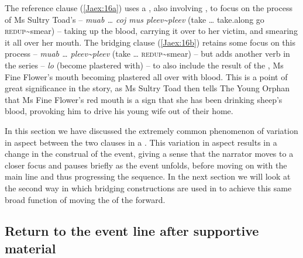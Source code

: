 \documentclass[output=paper]{LSP/langsci}
\begin{document}
\noindent
The reference clause (\ref{Jaex:16a}) uses a , also involving , to focus on the process of Ms Sultry Toad’s  – \textit{muab … coj mus pleev{\textasciitilde}pleev }(take … take.along go \textsc{redup}{\textasciitilde}smear) – taking up the blood, carrying it over to her victim, and smearing it all over her mouth. The bridging clause (\ref{Jaex:16b}) retains some focus on this process – \textit{muab … pleev{\textasciitilde}pleev }(take … \textsc{redup}{\textasciitilde}smear) – but adds another verb in the series – \textit{lo }(become plastered with) – to also include the result of the , Ms Fine Flower’s mouth becoming plastered all over with blood. This is a point of great significance in the story, as Ms Sultry Toad then tells The Young Orphan that Ms Fine Flower’s red mouth is a sign that she has been drinking sheep’s blood, provoking him to drive his young wife out of their home.
 
In this section we have discussed the extremely common phenomenon of variation in aspect between the two clauses in a . This variation in aspect results in a change in the construal of the event, giving a sense that the narrator moves to a closer focus and pauses briefly as the event unfolds, before moving on with the main line and thus progressing the  sequence. In the next section we will look at the second way in which bridging constructions are used in  to achieve this same broad function of moving the  of the  forward.
 
\subsection{Return to the event line after supportive material}
\label{JaReturn}
 
\end{document}
